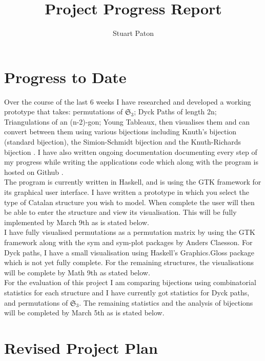 \documentclass[10pt]{article}
\begin{document}
\title{Project Progress Report}
\author{Stuart Paton}

\maketitle
\thispagestyle{empty}


\section{Progress to Date}
Over the course of the last 6 weeks I have researched and developed a working prototype that takes: permutations of $\mathfrak{S}_3$; Dyck Paths of length 2n; Triangulations of an (n-2)-gon; Young Tableaux, then visualises them and can convert between them using various bijections including Knuth's bijection (standard bijection), the Simion-Schmidt bijection and the Knuth-Richards bijection \cite{Clae01}. I have also written ongoing documentation documenting every step of my progress while writing the applications code which along with the program is hosted on Github \cite{patons02git}.\\
The program is currently written in Haskell, and is using the GTK framework for its graphical user interface. I have written a prototype in which you select the type of Catalan structure you wish to model. When complete the user will then be able to enter the structure and view its visualisation. This will be fully implemented by March 9th as is stated below.\\
I have fully visualised permutations as a permutation matrix by using the GTK framework along with the sym\cite{ClaeSym} and sym-plot\cite{ClaeSymPlot} packages by Anders Claesson. For Dyck paths, I have a small visualisation using Haskell's Graphics.Gloss package which is not yet fully complete. For the remaining structures, the visualisations will be complete by Math 9th as stated below.\\
For the evaluation of this project I am comparing bijections using combinatorial statistics for each structure and I have currently got statistics for Dyck paths, and permutations of $\mathfrak{S}_3$. The remaining statistics and the analysis of bijections will be completed by March 5th as is stated below.

\section{Revised Project Plan}
\end{document}
